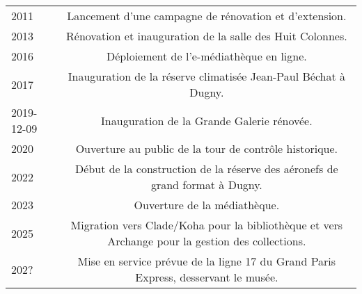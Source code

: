 \begin{longtable}{B C}
2011 & Lancement d’une campagne de rénovation et d’extension. \\
2013 & Rénovation et inauguration de la salle des Huit Colonnes. \\
2016 & Déploiement de l’e-médiathèque en ligne. \\
2017 & Inauguration de la réserve climatisée Jean-Paul Béchat à Dugny. \\
2019-12-09 & Inauguration de la Grande Galerie rénovée. \\
2020 & Ouverture au public de la tour de contrôle historique. \\
2022 & Début de la construction de la réserve des aéronefs de grand format à Dugny. \\
2023 & Ouverture de la médiathèque. \\
2025 & Migration vers Clade/Koha pour la bibliothèque et vers Archange pour la gestion des collections. \\
202? & Mise en service prévue de la ligne 17 du Grand Paris Express, desservant le musée. \\
	
\end{longtable}